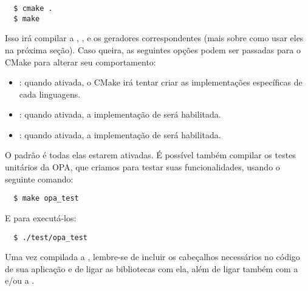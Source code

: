 \begin{verbatim}
  $ cmake .
  $ make
\end{verbatim}

Isso irá compilar a , ,  e 
os geradores correspondentes (mais sobre como usar eles na próxima seção). Caso queira, as
seguintes opções podem ser passadas para o CMake para alterar seu comportamento:

\begin{itemize}
  \item {}: quando ativada, o CMake irá tentar criar as 
    implementações específicas de cada linguagens.
  \item {}: quando ativada, a implementação de  será 
    habilitada.
  \item {}: quando ativada, a implementação de 
    será habilitada.
\end{itemize}

O padrão é todas elas estarem ativadas. É possível também compilar os testes unitários da
OPA, que criamos para testar suas funcionalidades, usando o seguinte comando:

\begin{verbatim}
  $ make opa_test
\end{verbatim}

E para executá-los:

\begin{verbatim}
  $ ./test/opa_test
\end{verbatim}

Uma vez compilada a , lembre-se de incluir os cabeçalhos necessários
no código de sua aplicação e de ligar as bibliotecas com ela, além de ligar também
com a  e/ou a .
    
